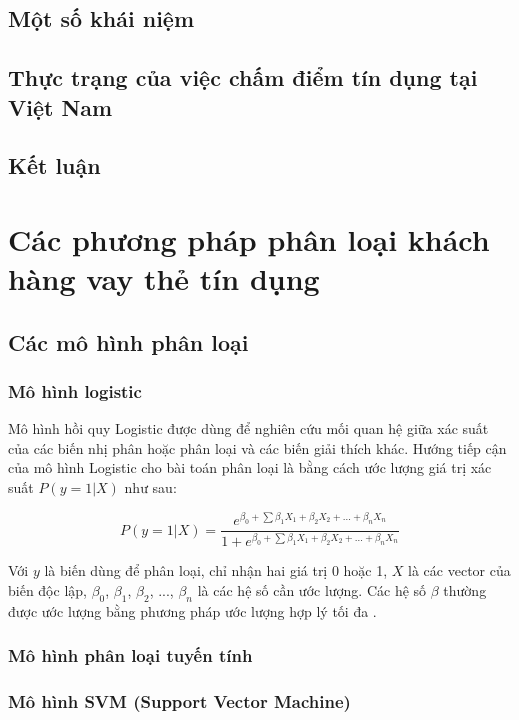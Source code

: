 \documentclass[a4paper]{report}\usepackage[]{graphicx}\usepackage[]{color}
\begin{document}
\section{Một số khái niệm}

\section{Thực trạng của việc chấm điểm tín dụng tại Việt Nam}

\section{Kết luận}


\chapter{Các phương pháp phân loại khách hàng vay thẻ tín dụng}
\section{Các mô hình phân loại}

\subsection{Mô hình logistic}

Mô hình hồi quy Logistic được dùng để nghiên cứu mối quan hệ giữa xác suất của các biến nhị phân hoặc phân loại và các biến giải thích khác. Hướng tiếp cận của mô hình Logistic cho bài toán phân loại là bằng cách ước lượng giá trị xác suất $P(y = 1|X)$ như sau:

{\large
$$
P(y = 1|X) = \frac{e^{\beta_0 + \sum\beta_1X_1 +\beta_2X_2 + \ldots + \beta_nX_n}}{1 + e^{\beta_0 + \sum\beta_1X_1 +\beta_2X_2 + \ldots + \beta_nX_n}}
$$
}

Với $y$ là biến dùng để phân loại, chỉ nhận hai giá trị 0 hoặc 1, $X$ là các vector của biến độc lập, $\beta_0$, $\beta_1$, $\beta_2$, ..., $\beta_n$ là các hệ số cần ước lượng. Các hệ số $\beta$ thường được ước lượng bằng phương pháp ước lượng hợp lý tối đa \citep{hosmer2013applied}.

\subsection{Mô hình phân loại tuyến tính}
\subsection{Mô hình SVM (Support Vector Machine)}
\end{document}
